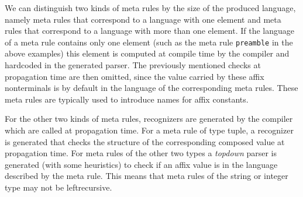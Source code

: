 We can distinguish two kinds of meta rules by the size of the
produced language, namely meta rules that correspond to a language
with one element and meta rules that correspond to a language
with more than one element. If the language of a meta rule contains
only one element (such as the meta rule {\tt preamble} in the above
examples) this element is computed at compile time by the \EAG compiler
and hardcoded in the generated parser. The previously mentioned 
checks at propagation time are then omitted, since the value carried by
these affix nonterminals is by default in the language of the
corresponding meta rules. These meta rules are typically used
to introduce names for affix constants.

For the other two kinds of meta rules, recognizers are generated
by the compiler which are called at propagation time. For a
meta rule of type tuple, a recognizer is generated that checks
the structure of the corresponding composed value at propagation
time. For meta rules of the other two types a {\em topdown}
parser is generated (with some heuristics) to check if an
affix value is in the language described by the meta rule.
This means that meta rules of the string or integer type may not
be leftrecursive.
